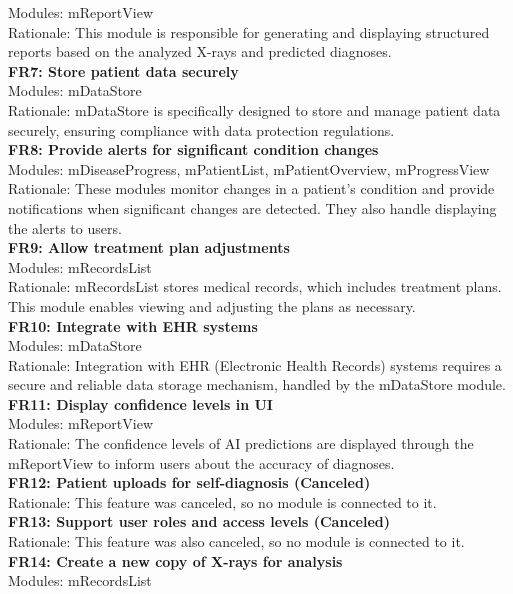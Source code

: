 \documentclass[12pt, titlepage]{article}
\begin{document}
Modules: mReportView \\
Rationale: This module is responsible for generating and displaying structured reports based on the analyzed X-rays and predicted diagnoses. \\
\textbf{FR7: Store patient data securely} \\
Modules: mDataStore \\
Rationale: mDataStore is specifically designed to store and manage patient data securely, ensuring compliance with data protection regulations. \\
\textbf{FR8: Provide alerts for significant condition changes} \\
Modules: mDiseaseProgress, mPatientList, mPatientOverview, mProgressView \\
Rationale: These modules monitor changes in a patient's condition and provide notifications when significant changes are detected. They also handle displaying the alerts to users. \\
\textbf{FR9: Allow treatment plan adjustments} \\
Modules: mRecordsList \\
Rationale: mRecordsList stores medical records, which includes treatment plans. This module enables viewing and adjusting the plans as necessary. \\
\textbf{FR10: Integrate with EHR systems} \\
Modules: mDataStore \\
Rationale: Integration with EHR (Electronic Health Records) systems requires a secure and reliable data storage mechanism, handled by the mDataStore module. \\
\textbf{FR11: Display confidence levels in UI} \\
Modules: mReportView \\
Rationale: The confidence levels of AI predictions are displayed through the mReportView to inform users about the accuracy of diagnoses. \\
\textbf{FR12: Patient uploads for self-diagnosis (Canceled)} \\
Rationale: This feature was canceled, so no module is connected to it. \\
\textbf{FR13: Support user roles and access levels (Canceled)} \\
Rationale: This feature was also canceled, so no module is connected to it. \\
\textbf{FR14: Create a new copy of X-rays for analysis} \\
Modules: mRecordsList \\
\end{document}
